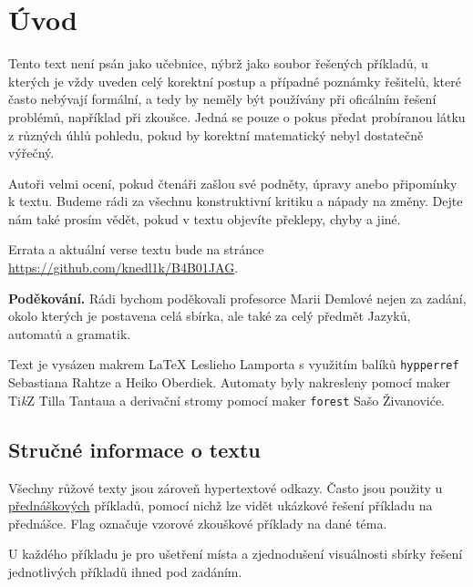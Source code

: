 \section*{Úvod}

\hspace{0.8cm} Tento text není psán jako učebnice, nýbrž jako soubor řešených příkladů, u kterých je vždy uveden celý korektní postup
a případné poznámky řešitelů, které často nebývají formální, a tedy by neměly být používány při oficálním řešení problémů, 
například při zkoušce. Jedná se pouze o pokus předat probíranou látku z různých úhlů pohledu, pokud by korektní matematický
nebyl dostatečně výřečný.

\hspace{0.8cm} Autoři velmi ocení, pokud čtenáři zašlou své podněty, úpravy anebo připomínky k textu. Budeme rádi za všechnu konstruktivní
kritiku a nápady na změny. Dejte nám také prosím vědět, pokud v textu objevíte překlepy, chyby a jiné.

Errata a aktuální verse textu bude na stránce \url{https://github.com/knedl1k/B4B01JAG}.

\textbf{Poděkování.} Rádi bychom poděkovali profesorce Marii Demlové nejen za zadání, okolo kterých je postavena celá sbírka,
ale také za celý předmět Jazyků, automatů a gramatik.

\hspace{0.8cm} Text je vysázen makrem \LaTeX{} Leslieho Lamporta s využitím balíků \texttt{hypperref} \\ 
Sebastiana Rahtze a Heiko Oberdiek. Automaty byly nakresleny pomocí maker Ti\textit{k}Z Tilla Tantaua a derivační
stromy pomocí maker \texttt{forest} Sašo Živanoviće.

\subsection*{Stručné informace o textu}
Všechny růžové texty jsou zároveň hypertextové odkazy. Často jsou použity u  
\href{https://youtube.com/playlist?list=PLQL6z4JeTTQkLuzI78OTnfYBclE1g0UjS&si=7fIuogtxj7mi1HZ-}{přednáškových} 
příkladů, pomocí nichž lze vidět ukázkové řešení příkladu na přednášce. Flag  označuje vzorové zkouškové 
příklady na dané téma. 

U každého příkladu je pro ušetření místa a zjednodušení visuálnosti sbírky řešení jednotlivých příkladů ihned pod zadáním.

